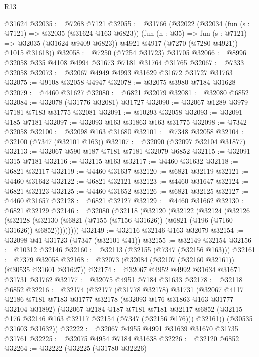 \begin{lexlean}{R13}
\begin{coremodule}
    @31624
@32035 := @7268 @7121
@32055 := @31766
    (@32022
      (@32034
        (fun (s : @7121) => @32035 (@31624 @163 @6823))
        (fun (n : @35) => fun (s : @7121) => @32035 (@31624 @9409 @6823))
        @4921
        @4917
        (@7270 (@7280 @4921))
        @1015
        @31618))
@32058 := @7250 (@7254 @31723) @31705
@32066 := @8996 @32058 @335 @4108 @4994 @31673 @7181 @31764 @31765
@32067 := @7333 @32058
@32073 := @32067 @4949 @4993 @31629 @31672 @31727 @31763
@32075 := @9108 @32058 @4947
@32078 := @32075 @3980 @7184 @31628
@32079 := @4460 @31627
@32080 := @6821 @32079
@32081 := @32080 @6852
@32084 := @32078 (@31776 @32081) @31727
@32090 := @32067 @1289 @3979 @7181 @7183 @31775 @32081
@32091 := @10293 @32058
@32093 := @32091 @185 @7181
@32097 := @32093 @163 @31863 @163 @31775
@32098 := @7342 @32058
@32100 := @32098 @163 @31680
@32101 := @7348 @32058
@32104 := @32100 (@7347 (@32101 @163))
@32107 := @32090 (@32097 @32104 @31877)
@32113 := @32067 @590 @187 @7181 @7181 @32079 @6852
@32115 := @32091 @315 @7181
@32116 := @32115 @163
@32117 := @4460 @31632
@32118 := @6821 @32117
@32119 := @4460 @31637
@32120 := @6821 @32119
@32121 := @4460 @31642
@32122 := @6821 @32121
@32123 := @4460 @31647
@32124 := @6821 @32123
@32125 := @4460 @31652
@32126 := @6821 @32125
@32127 := @4460 @31657
@32128 := @6821 @32127
@32129 := @4460 @31662
@32130 := @6821 @32129
@32146 := @32080
    (@32118
      (@32120
        (@32122
          (@32124
            (@32126
              (@32128
                (@32130 (@6821 (@7155 (@7156 @31626)) (@6821 (@196 (@7160 @31626)) @6852)))))))))
@32149 := @32116 @32146 @163 @32079
@32154 := @32098 @41 @31723 (@7347 (@32101 @41))
@32155 := @32149 @32154
@32156 := @10312 @32146
@32160 := @32113 (@32155 (@7347 (@32156 @163)))
@32161 := @7379 @32058
@32168 := @32073 (@32084 (@32107 (@32160 @32161)) (@30535 @31601 @31627))
@32174 := @32067 @4952 @4992 @31634 @31671 @31731 @31762
@32177 := @32075 @4951 @7184 @31633
@32178 := @32118 @6852
@32216 := @32174
    (@32177
      (@31778 @32178)
      @31731
      (@32067
        @4117
        @2186
        @7181
        @7183
        @31777
        @32178
        (@32093 @176 @31863 @163 @31777 @32104 @31892)
        (@32067
          @2184
          @187
          @7181
          @7181
          @32117
          @6852
          (@32115 @176 @32146 @163 @32117 @32154 (@7347 (@32156 @176)))
          @32161))
      (@30535 @31603 @31632))
@32222 := @32067 @4955 @4991 @31639 @31670 @31735 @31761
@32225 := @32075 @4954 @7184 @31638
@32226 := @32120 @6852
@32264 := @32222
    (@32225
      (@31780 @32226)

\end{coremodule}
\end{lexlean}
